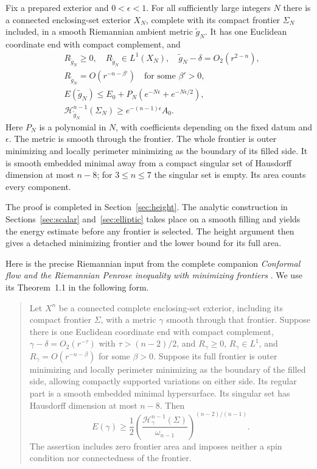 \begin{theorem}\label{thm:prepared:deformation}
\label{prop:height:enclosure}
Fix a prepared exterior and $0<\epsilon<1$. For all sufficiently large
integers $N$ there is a connected enclosing-set exterior $X_N$, complete
with its compact frontier $\Sigma_N$ included, in a smooth Riemannian
ambient metric $\widetilde g_N$. It has one Euclidean coordinate end
with compact complement, and
\begin{equation}\label{eq:height:enclosure-estimates}
\begin{split}
 &R_{\widetilde g_N}\ge0,\quad R_{\widetilde g_N}\in L^1(X_N),
 \quad \widetilde g_N-\delta=O_2(r^{2-n}),\\
 &R_{\widetilde g_N}=O(r^{-n-\beta'})\quad\text{for some }\beta'>0,\\
 &E(\widetilde g_N)\le E_0+P_N(e^{-N\epsilon}+e^{-N\epsilon/2}),\\
 &\mathcal H^{n-1}_{\widetilde g_N}(\Sigma_N)
       \ge e^{-(n-1)\epsilon}A_0.
\end{split}
\end{equation}
Here $P_N$ is a polynomial in $N$, with coefficients depending on the
fixed datum and $\epsilon$. The metric is smooth through the frontier.
The whole frontier is outer minimizing and locally perimeter minimizing
as the boundary of its filled side. It is smooth embedded minimal away
from a compact singular set of Hausdorff dimension at most $n-8$; for
$3\le n\le7$ the singular set is empty. Its area counts every component.
\end{theorem}

The proof is completed in Section~\ref{sec:height}. The analytic
construction in Sections~\ref{sec:scalar} and~\ref{sec:elliptic} takes
place on a smooth filling and yields the energy estimate before any
frontier is selected. The height argument then gives a detached minimizing
frontier and the lower bound for its full area.

Here is the precise Riemannian input from the complete companion
\emph{Conformal flow and the Riemannian Penrose inequality with minimizing
frontiers} \cite{RiemannianCompanion}. We use its Theorem~1.1 in the following form.
\begin{quote}
Let $X^n$ be a connected complete enclosing-set exterior, including its
compact frontier $\Sigma$, with a metric $\gamma$ smooth through that
frontier. Suppose there is one Euclidean coordinate end with compact
complement, $\gamma-\delta=O_2(r^{-\tau})$ with
$\tau>(n-2)/2$, and
$R_\gamma\ge0$, $R_\gamma\in L^1$, and
$R_\gamma=O(r^{-n-\beta})$ for some $\beta>0$. Suppose its full frontier
is outer minimizing and locally perimeter minimizing as the boundary
of the filled side, allowing compactly supported variations on either side.
Its regular part is a smooth embedded minimal hypersurface. Its
singular set has Hausdorff dimension at most $n-8$. Then
\[
 E(\gamma)\ge\frac12
 \left(\frac{\mathcal H^{n-1}_\gamma(\Sigma)}{\omega_{n-1}}
 \right)^{(n-2)/(n-1)}.
\]
The assertion includes zero frontier area and imposes neither a spin
condition nor connectedness of the frontier.
\end{quote}

